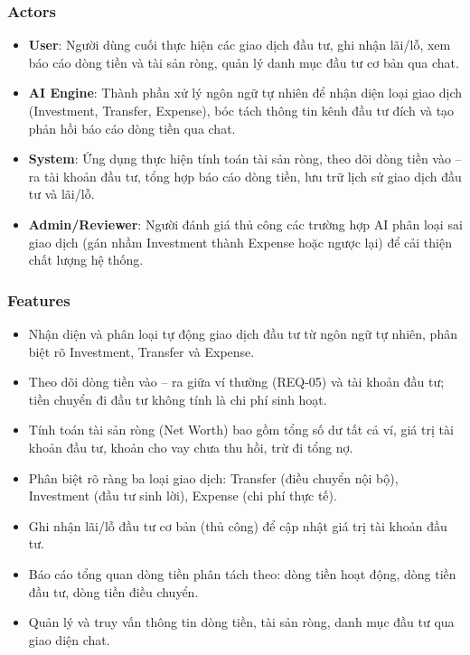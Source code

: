 \subsubsection{Actors}

\begin{itemize}
\item \textbf{User}: Người dùng cuối thực hiện các giao dịch đầu tư, ghi nhận lãi/lỗ, xem báo cáo dòng tiền và tài sản ròng, quản lý danh mục đầu tư cơ bản qua chat.
\item \textbf{AI Engine}: Thành phần xử lý ngôn ngữ tự nhiên để nhận diện loại giao dịch (Investment, Transfer, Expense), bóc tách thông tin kênh đầu tư đích và tạo phản hồi báo cáo dòng tiền qua chat.
\item \textbf{System}: Ứng dụng thực hiện tính toán tài sản ròng, theo dõi dòng tiền vào – ra tài khoản đầu tư, tổng hợp báo cáo dòng tiền, lưu trữ lịch sử giao dịch đầu tư và lãi/lỗ.
\item \textbf{Admin/Reviewer}: Người đánh giá thủ công các trường hợp AI phân loại sai giao dịch (gán nhầm Investment thành Expense hoặc ngược lại) để cải thiện chất lượng hệ thống.
\end{itemize}
\subsubsection{Features}

\begin{itemize}
\item Nhận diện và phân loại tự động giao dịch đầu tư từ ngôn ngữ tự nhiên, phân biệt rõ Investment, Transfer và Expense.
\item Theo dõi dòng tiền vào – ra giữa ví thường (REQ-05) và tài khoản đầu tư; tiền chuyển đi đầu tư không tính là chi phí sinh hoạt.
\item Tính toán tài sản ròng (Net Worth) bao gồm tổng số dư tất cả ví, giá trị tài khoản đầu tư, khoản cho vay chưa thu hồi, trừ đi tổng nợ.
\item Phân biệt rõ ràng ba loại giao dịch: Transfer (điều chuyển nội bộ), Investment (đầu tư sinh lời), Expense (chi phí thực tế).
\item Ghi nhận lãi/lỗ đầu tư cơ bản (thủ công) để cập nhật giá trị tài khoản đầu tư.
\item Báo cáo tổng quan dòng tiền phân tách theo: dòng tiền hoạt động, dòng tiền đầu tư, dòng tiền điều chuyển.
\item Quản lý và truy vấn thông tin dòng tiền, tài sản ròng, danh mục đầu tư qua giao diện chat.
\end{itemize}
